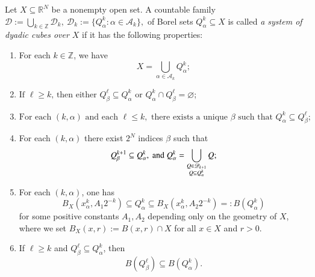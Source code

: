\documentclass[12pt]{amsart}
\begin{document}
\begin{definition}\label{Defsystem}{\rm
Let {\color{red}$X\subseteq \mathbb{R}^N$ be a nonempty open set}. A countable family
$
    \mathscr{D}
    := \bigcup_{k\in\mathbb{Z}}\mathscr{D}_{k}, \
    \mathscr{D}_{k}
    :=\{Q^k_{\alpha}\colon \alpha\in \mathscr{A}_k\},
$
of Borel sets $Q^k_{\alpha}\subseteq X$ is called \textit{a
system of dyadic cubes over  $X$}  if it has the following properties:

\begin{enumerate}
  \item[(i)] For each $k\in\mathbb{Z}$, we have $$    X
    = \bigcup_{\alpha\in \mathscr{A}_k} Q^k_{\alpha};$$\smallskip

  \item[(ii)] $\text{If }\ell\geq k\text{, then either }
        Q^{\ell}_{\beta}\subseteq Q^k_{\alpha}\text{ or }
        Q^k_{\alpha}\cap Q^{\ell}_{\beta}=\varnothing$;\smallskip

  \item[(iii)] $
    \text{For each }(k,\alpha)\text{ and each } \ell\leq k,
    \text{ there exists a unique } \beta
    \text{ such that }Q^{k}_{\alpha}\subseteq Q^\ell_{\beta};
$

\smallskip

\item[(iv)] For each $(k,\alpha)$ there exist $2^N$ indices $\beta$ such that
    $$ Q^{k+1}_{\beta}\subseteq Q^k_{\alpha},\ {\rm and}\
        Q^k_{\alpha} =\bigcup_{{\substack{Q\in\mathscr{D}_{k+1}\\ Q\subseteq Q^k_{\alpha}}}}Q;$$

\smallskip

\item[(v)] For each $(k,\alpha)$, one has $$B_X(x^k_{\alpha},A_1 2^{-k})
    \subseteq Q^k_{\alpha}\subseteq B_X(x^k_{\alpha},A_2 2^{-k})
    =: B(Q^k_{\alpha})$$
    for some positive constants $A_1,A_2$ depending only on the geometry of $X$, {\color{red}where we set $B_X(x,r):=B(x,r)\cap X$ for all $x\in X$ and $r>0$.}

\smallskip

\item [(vi)]  If $\ell\geq k$ and
   $Q^{\ell}_{\beta}\subseteq Q^k_{\alpha}$, then
   $$B(Q^{\ell}_{\beta})\subseteq B(Q^k_{\alpha}).$$
\end{enumerate}



   }
\end{definition}
\end{document}
